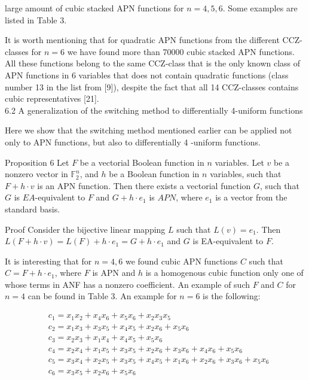 \documentclass[10pt]{article}
\begin{document}
large amount of cubic stacked APN functions for $n=4,5,6$. Some examples are listed in Table 3.

It is worth mentioning that for quadratic APN functions from the different CCZ-classes for $n=6$ we have found more than 70000 cubic stacked APN functions. All these functions belong to the same CCZ-class that is the only known class of APN functions in 6 variables that does not contain quadratic functions (class number 13 in the list from [9]), despite the fact that all 14 CCZ-classes contains cubic representatives [21].\\
6.2 A generalization of the switching method to differentially 4-uniform functions

Here we show that the switching method mentioned earlier can be applied not only to APN functions, but also to differentially 4 -uniform functions.

Proposition 6 Let $F$ be a vectorial Boolean function in $n$ variables. Let $v$ be a nonzero vector in $\mathbb{F}_{2}^{n}$, and $h$ be a Boolean function in $n$ variables, such that $F+h \cdot v$ is an APN function. Then there exists a vectorial function $G$, such that $G$ is $E A$-equivalent to $F$ and $G+h \cdot e_{1}$ is $A P N$, where $e_{1}$ is a vector from the standard basis.

Proof Consider the bijective linear mapping $L$ such that $L(v)=e_{1}$. Then $L(F+h \cdot v)=L(F)+h \cdot e_{1}=G+h \cdot e_{1}$ and $G$ is EA-equivalent to $F$.

It is interesting that for $n=4,6$ we found cubic APN functions $C$ such that $C=F+h \cdot e_{1}$, where $F$ is APN and $h$ is a homogenous cubic function only one of whose terms in ANF has a nonzero coefficient. An example of such $F$ and $C$ for $n=4$ can be found in Table 3. An example for $n=6$ is the following:

$$
\begin{aligned}
& c_{1}=x_{1} x_{2}+x_{4} x_{6}+x_{5} x_{6}+x_{2} x_{3} x_{5} \\
& c_{2}=x_{1} x_{3}+x_{3} x_{5}+x_{4} x_{5}+x_{2} x_{6}+x_{5} x_{6} \\
& c_{3}=x_{2} x_{3}+x_{1} x_{4}+x_{4} x_{5}+x_{5} x_{6} \\
& c_{4}=x_{2} x_{4}+x_{1} x_{5}+x_{3} x_{5}+x_{2} x_{6}+x_{3} x_{6}+x_{4} x_{6}+x_{5} x_{6} \\
& c_{5}=x_{3} x_{4}+x_{2} x_{5}+x_{3} x_{5}+x_{4} x_{5}+x_{1} x_{6}+x_{2} x_{6}+x_{3} x_{6}+x_{5} x_{6} \\
& c_{6}=x_{3} x_{5}+x_{2} x_{6}+x_{5} x_{6}
\end{aligned}
$$
\end{document}
